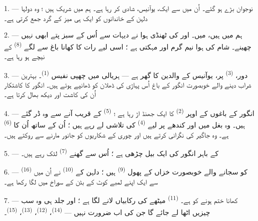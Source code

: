 \VUsaut{4.0mm}
\VUsaut{1.6mm}
\VUsaut{3.2mm}

\VUsaut{1.6mm}
\VUsaut{2.6mm}

\VUsaut{3.0mm}

1. --- نوجوان بڑے ہو گئے۔ اُن میں سے ایک، یوآنیس، شادی کر رہا ہے۔ ہم
 میں شریک ہیں ؛ وہ دولہا دلہن کے خاندانوں کو ایک
ہی میز کے گرد جمع کرتی ہے۔

2. --- ہم  میں ہیں،  میں۔
 اور  کی ٹھنڈی ہوا نے دیہات سے اُس کے سبز
پتے ابھی نہیں چھینے۔ شام کی ہوا نیم گرم اور مہکتی ہے ؛ اسی لیے رات کا
کھانا باغ سے لگے  \textsuperscript{(8)} کے نیچے ہو رہا
ہے۔

3. --- دور،  \textsuperscript{(3)} پر، یوآنیس کے والدین
کا گھر ہے — ہریالی میں چھپی نفیس  \textsuperscript{(1)}۔
بہترین شراب دینے والے خوبصورت انگور کے باغ اُس پہاڑی کی ڈھلان کو
ڈھانپے ہوئے ہیں۔ انگور کا کاشتکار اُن کی کاشت اور دیکھ بھال کرتا ہے۔

4. --- انگور کے باغوں کے اوپر  \textsuperscript{(2)} کا
ایک جھنڈ اڑ رہا ہے ؛  \textsuperscript{(5)} کے
قریب آنے سے وہ ڈر گئے ہیں۔ وہ بغل میں  اور کندھے پر
 لیے  \textsuperscript{(4)} کی
تلاشی لے رہے ہیں ؛ اُن کے ساتھ اُن کا 
\textsuperscript{(6)} ہے۔ وہ جاگیر کی نگرانی کرتے ہیں اور چوری کے
شکاریوں کو جانور مارنے سے روکتے ہیں۔

5. ---  کے باہر انگور کی ایک بیل چڑھی ہے ؛ اُس سے گھنے
 \textsuperscript{(7)} لٹک رہے ہیں۔

6. ---  \textsuperscript{(16)} کو سجانے والے خوبصورت خزاں
کے پھول  \textsuperscript{(9)} ہیں ؛ دلہن کے
 \textsuperscript{(10)} نے اُن میں سے ایک اپنے لمبے کوٹ کے
بٹن کے سوراخ میں لگا رکھا ہے۔

7. --- کھانا ختم ہونے کو ہے۔  \textsuperscript{(11)}
میٹھے کی رکابیاں لانے لگا ہے ؛ اور جلد ہی وہ سب چیزیں اٹھا لے جائے
گا جن کی اب ضرورت نہیں —  \textsuperscript{(14)}،
 \textsuperscript{(12)}، 
\textsuperscript{(13)}،  \textsuperscript{(15)}۔

